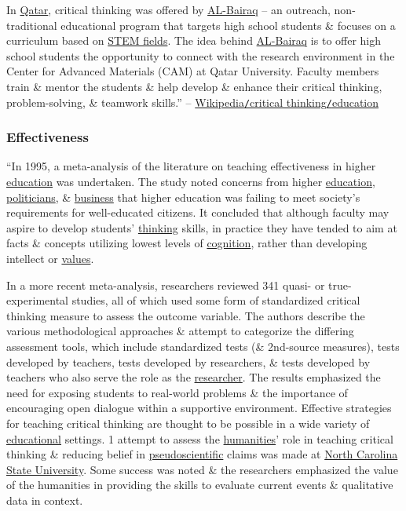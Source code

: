 \documentclass[oneside]{book}
\numberwithin{equation}{section}
\begin{document}
In \href{https://en.wikipedia.org/wiki/Qatar}{Qatar}, critical thinking was offered by \href{https://en.wikipedia.org/wiki/AL-Bairaq}{AL-Bairaq} -- an outreach, non-traditional educational program that targets high school students \& focuses on a curriculum based on \href{https://en.wikipedia.org/wiki/STEM_fields}{STEM fields}. The idea behind \href{https://en.wikipedia.org/wiki/AL-Bairaq}{AL-Bairaq} is to offer high school students the opportunity to connect with the research environment in the Center for Advanced Materials (CAM) at Qatar University. Faculty members train \& mentor the students \& help develop \& enhance their critical thinking, problem-solving, \& teamwork skills.'' -- \href{https://en.wikipedia.org/wiki/Critical_thinking#Education}{Wikipedia\texttt{/}critical thinking\texttt{/}education}

\subsubsection{Effectiveness}
``In 1995, a meta-analysis of the literature on teaching effectiveness in higher \href{https://en.wikipedia.org/wiki/Education}{education} was undertaken. The study noted concerns from higher \href{https://en.wikipedia.org/wiki/Education}{education}, \href{https://en.wikipedia.org/wiki/Politician}{politicians}, \& \href{https://en.wikipedia.org/wiki/Business}{business} that higher education was failing to meet society's requirements for well-educated citizens. It concluded that although faculty may aspire to develop students' \href{https://en.wikipedia.org/wiki/Thinking}{thinking} skills, in practice they have tended to aim at facts \& concepts utilizing lowest levels of \href{https://en.wikipedia.org/wiki/Cognition}{cognition}, rather than developing intellect or \href{https://en.wikipedia.org/wiki/Values}{values}.

In a more recent meta-analysis, researchers reviewed 341 quasi- or true-experimental studies, all of which used some form of standardized critical thinking measure to assess the outcome variable. The authors describe the various methodological approaches \& attempt to categorize the differing assessment tools, which include standardized tests (\& 2nd-source measures), tests developed by teachers, tests developed by researchers, \& tests developed by teachers who also serve the role as the \href{https://en.wikipedia.org/wiki/Researcher}{researcher}. The results emphasized the need for exposing students to real-world problems \& the importance of encouraging open dialogue within a supportive environment. Effective strategies for teaching critical thinking are thought to be possible in a wide variety of \href{https://en.wikipedia.org/wiki/Educational}{educational} settings. 1 attempt to assess the \href{https://en.wikipedia.org/wiki/Humanities}{humanities}' role in teaching critical thinking \& reducing belief in \href{https://en.wikipedia.org/wiki/Pseudoscience}{pseudoscientific} claims was made at \href{https://en.wikipedia.org/wiki/North_Carolina_State_University}{North Carolina State University}. Some success was noted \& the researchers emphasized the value of the humanities in providing the skills to evaluate current events \& qualitative data in context.
\end{document}
